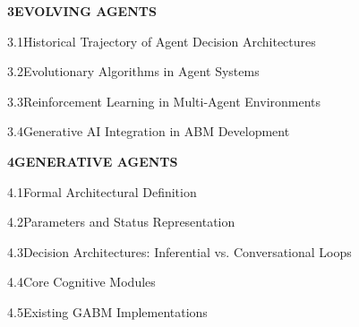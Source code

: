 \documentclass[12pt,a4paper]{report}
\begin{document}
\noindent\textbf{3\quad EVOLVING AGENTS}\dotfill\textbf{\pageref{chap:evolving_agents}}\par
\vspace{3pt}
\noindent\hspace{0.3in}3.1\quad Historical Trajectory of Agent Decision Architectures\dotfill\pageref{sec:history_agents}\par
\vspace{2pt}
\noindent\hspace{0.3in}3.2\quad Evolutionary Algorithms in Agent Systems\dotfill\pageref{sec:eas}\par
\vspace{2pt}
\noindent\hspace{0.3in}3.3\quad Reinforcement Learning in Multi-Agent Environments\dotfill\pageref{sec:rl}\par
\vspace{2pt}
\noindent\hspace{0.3in}3.4\quad Generative AI Integration in ABM Development\dotfill\pageref{sec:genai_roles}\par
\vspace{6pt}

\noindent\textbf{4\quad GENERATIVE AGENTS}\dotfill\textbf{\pageref{chap:generative_agents}}\par
\vspace{3pt}
\noindent\hspace{0.3in}4.1\quad Formal Architectural Definition\dotfill\pageref{sec:ga_def}\par
\vspace{2pt}
\noindent\hspace{0.3in}4.2\quad Parameters and Status Representation\dotfill\pageref{sec:parameters_status}\par
\vspace{2pt}
\noindent\hspace{0.3in}4.3\quad Decision Architectures: Inferential vs. Conversational Loops\dotfill\pageref{sec:feedback_loops}\par
\vspace{2pt}
\noindent\hspace{0.3in}4.4\quad Core Cognitive Modules\dotfill\pageref{sec:cognitive_modules}\par
\vspace{2pt}
\noindent\hspace{0.3in}4.5\quad Existing GABM Implementations\dotfill\pageref{sec:prominent_gabms}\par
\vspace{6pt}
\end{document}

